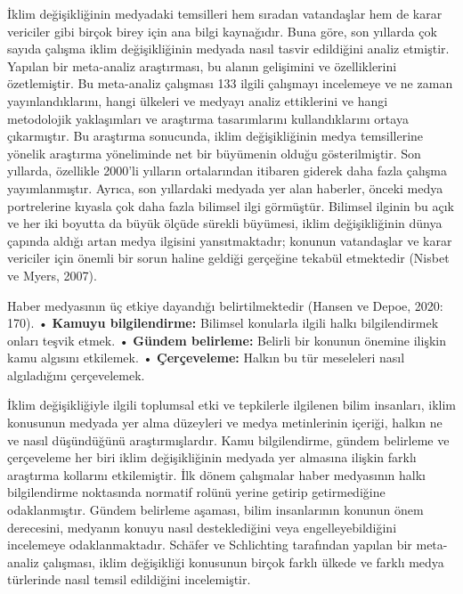 \documentclass[
]{book}
\begin{document}
İklim değişikliğinin medyadaki temsilleri hem sıradan vatandaşlar hem de karar vericiler gibi birçok birey için ana bilgi kaynağıdır. Buna göre, son yıllarda çok sayıda çalışma iklim değişikliğinin medyada nasıl tasvir edildiğini analiz etmiştir. Yapılan bir meta-analiz araştırması, bu alanın gelişimini ve özelliklerini özetlemiştir. Bu meta-analiz çalışması 133 ilgili çalışmayı incelemeye ve ne zaman yayınlandıklarını, hangi ülkeleri ve medyayı analiz ettiklerini ve hangi metodolojik yaklaşımları ve araştırma tasarımlarını kullandıklarını ortaya çıkarmıştır. Bu araştırma sonucunda, iklim değişikliğinin medya temsillerine yönelik araştırma yöneliminde net bir büyümenin olduğu gösterilmiştir. Son yıllarda, özellikle 2000'li yılların ortalarından itibaren giderek daha fazla çalışma yayımlanmıştır. Ayrıca, son yıllardaki medyada yer alan haberler, önceki medya portrelerine kıyasla çok daha fazla bilimsel ilgi görmüştür. Bilimsel ilginin bu açık ve her iki boyutta da büyük ölçüde sürekli büyümesi, iklim değişikliğinin dünya çapında aldığı artan medya ilgisini yansıtmaktadır; \citep{schmidt2013media} konunun vatandaşlar ve karar vericiler için önemli bir sorun haline geldiği gerçeğine tekabül etmektedir (Nisbet ve Myers, 2007). \citep{nisbet2007polls}

Haber medyasının üç etkiye dayandığı belirtilmektedir (Hansen ve Depoe, 2020: 170).
• \textbf{Kamuyu bilgilendirme:} Bilimsel konularla ilgili halkı bilgilendirmek onları teşvik etmek.
• \textbf{Gündem belirleme:} Belirli bir konunun önemine ilişkin kamu algısını etkilemek.
• \textbf{Çerçeveleme:} Halkın bu tür meseleleri nasıl algıladığını çerçevelemek.

İklim değişikliğiyle ilgili toplumsal etki ve tepkilerle ilgilenen bilim insanları, iklim konusunun medyada yer alma düzeyleri ve medya metinlerinin içeriği, halkın ne ve nasıl düşündüğünü araştırmışlardır. Kamu bilgilendirme, gündem belirleme ve çerçeveleme her biri iklim değişikliğinin medyada yer almasına ilişkin farklı araştırma kollarını etkilemiştir. İlk dönem çalışmalar haber medyasının halkı bilgilendirme noktasında normatif rolünü yerine getirip getirmediğine odaklanmıştır.
Gündem belirleme aşaması, bilim insanlarının konunun önem derecesini, medyanın konuyu nasıl desteklediğini veya engelleyebildiğini incelemeye odaklanmaktadır. Schäfer ve Schlichting tarafından yapılan bir meta-analiz çalışması, iklim değişikliği konusunun birçok farklı ülkede ve farklı medya türlerinde nasıl temsil edildiğini incelemiştir. \citep{schaefer2014media}
\end{document}
